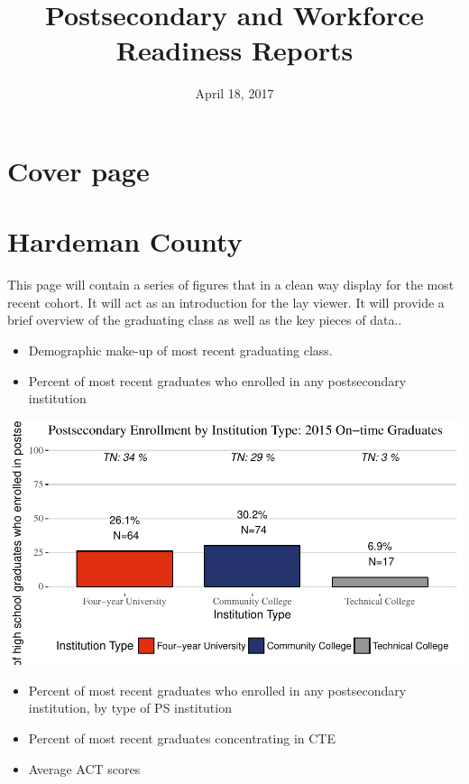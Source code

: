 \documentclass[11pt,]{article}
\title{Postsecondary and Workforce Readiness Reports}
\author{}
\date{April 18, 2017}
\providecommand{\tightlist}{%
  \setlength{\itemsep}{0pt}\setlength{\parskip}{0pt}}
\begin{document}
\maketitle

\section{Cover page}\label{cover-page}

\section{Hardeman County}\label{hardeman-county}

This page will contain a series of figures that in a clean way display
for the most recent cohort. It will act as an introduction for the lay
viewer. It will provide a brief overview of the graduating class as well
as the key pieces of data..

\begin{itemize}
\item
  Demographic make-up of most recent graduating class.
\item
  Percent of most recent graduates who enrolled in any postsecondary
  institution
\end{itemize}

\begin{center}\includegraphics{20170411_PSWRR_no_CTE_files/figure-latex/`District by Type P1`-1} \end{center}

\begin{itemize}
\tightlist
\item
  Percent of most recent graduates who enrolled in any postsecondary
  institution, by type of PS institution
\item
  Percent of most recent graduates concentrating in CTE
\item
  Average ACT scores 
\end{itemize}
\end{document}
